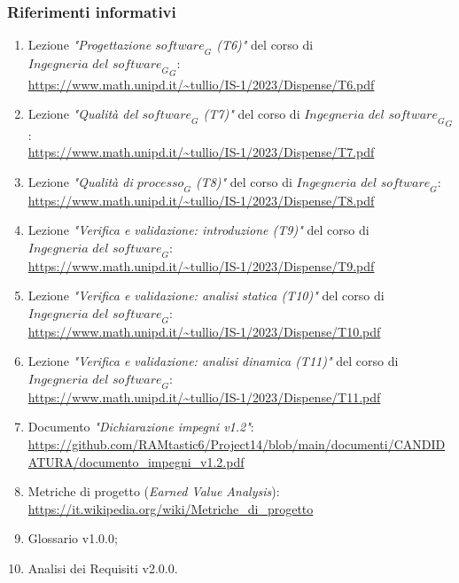 \subsubsection{Riferimenti informativi}
\label{sec:rif_inf}
\begin{enumerate}
    \item Lezione \emph{"Progettazione $\textit{software}_G$ (T6)"} del corso di $\textit{Ingegneria del $\textit{software}_G$}_G$: \\
    \url{https://www.math.unipd.it/~tullio/IS-1/2023/Dispense/T6.pdf}
    \item Lezione \emph{"Qualità del $\textit{software}_G$ (T7)"} del corso di $\textit{Ingegneria del $\textit{software}_G$}_G$: \\
    \url{https://www.math.unipd.it/~tullio/IS-1/2023/Dispense/T7.pdf}
    \item Lezione \emph{"Qualità di $\textit{processo}_G$ (T8)"} del corso di $\textit{Ingegneria del software}_G$: \\
    \url{https://www.math.unipd.it/~tullio/IS-1/2023/Dispense/T8.pdf}
    \item Lezione \emph{"Verifica e validazione: introduzione (T9)"} del corso di $\textit{Ingegneria del software}_G$: \\
    \url{https://www.math.unipd.it/~tullio/IS-1/2023/Dispense/T9.pdf}
    \item Lezione \emph{"Verifica e validazione: analisi statica (T10)"} del corso di $\textit{Ingegneria del software}_G$: \\
    \url{https://www.math.unipd.it/~tullio/IS-1/2023/Dispense/T10.pdf}
    \item Lezione \emph{"Verifica e validazione: analisi dinamica (T11)"} del corso di $\textit{Ingegneria del software}_G$: \\
    \url{https://www.math.unipd.it/~tullio/IS-1/2023/Dispense/T11.pdf}
     \item Documento \emph{"Dichiarazione impegni v1.2"}: \\ \url{https://github.com/RAMtastic6/Project14/blob/main/documenti/CANDIDATURA/documento_impegni_v1.2.pdf}
     \item Metriche di progetto (\emph{Earned Value Analysis}):\\
     \url{https://it.wikipedia.org/wiki/Metriche_di_progetto}
     \item Glossario v1.0.0;
     \item Analisi dei Requisiti v2.0.0.
\end{enumerate}
